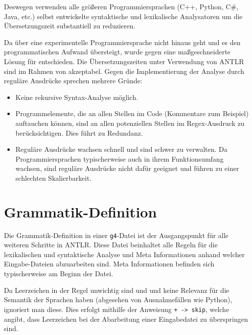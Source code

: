 Deswegen verwenden alle größeren Programmiersprachen (C++, Python, C\#, Java, etc.) selbst entwickelte syntaktische und lexikalische Analysatoren um die Übersetzungszeit substantiell zu reduzieren.

Da \toya über eine experimentelle Programmiersprache nicht hinaus geht und es den programmatischen Aufwand übersteigt, wurde gegen eine maßgeschneiderte Lösung für \toya entschieden. Die Übersetzungszeiten unter Verwendung von ANTLR sind im Rahmen von \toya akzeptabel. Gegen die Implementierung der Analyse durch reguläre Ausdrücke sprechen mehrere Gründe:
\begin{itemize}
    \item Keine rekursive Syntax-Analyse möglich.
    \item Programmelemente, die an allen Stellen im Code (Kommentare zum Beispiel) auftauchen können, sind an allen potenziellen Stellen im Regex-Ausdruck zu berücksichtigen. Dies führt zu Redundanz.
    \item Reguläre Ausdrücke wachsen schnell und sind schwer zu verwalten. Da Programmiersprachen typischerweise auch in ihrem Funktionsumfang wachsen, sind reguläre Ausdrücke nicht dafür geeignet und führen zu einer schlechten Skalierbarkeit.
\end{itemize}


\section{Grammatik-Definition}

Die Grammatik-Definition in einer \texttt{g4}-Datei ist der Ausgangspunkt für alle weiteren Schritte in ANTLR. Diese Datei beinhaltet alle Regeln für die lexikalischen und syntaktische Analyse und Meta Informationen anhand welcher Eingabe-Dateien abzuarbeiten sind. Meta Informationen befinden sich typischerweise am Beginn der Datei.

Da Leerzeichen in der Regel unwichtig sind und und keine Relevanz für die Semantik der Sprachen haben (abgesehen von Ausnahmefällen wie Python), ignoriert man diese. Dies erfolgt mithilfe der Anweisung \texttt{+ -> skip}, welche angibt, dass Leerzeichen bei der Abarbeitung einer Eingabedatei zu überspringen sind.

